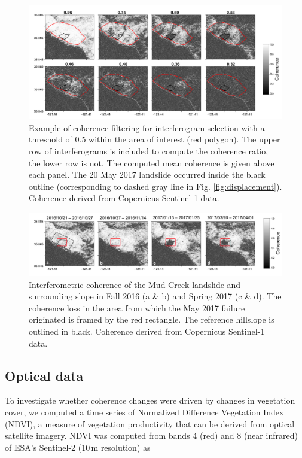 \documentclass[journal abbreviation, manuscript]{copernicus}
\begin{document}
\begin{figure}
    \centering
    \includegraphics[width = \textwidth]{coherence_filter_sample_bw.pdf}
    \caption{Example of coherence filtering for interferogram selection with a threshold of 0.5 within the area of interest (red polygon). The upper row of interferograms is included to compute the coherence ratio, the lower row is not. The computed mean coherence is given above each panel. The 20 May 2017 landslide occurred inside the black outline (corresponding to dashed gray line in Fig. \ref{fig:displacement}). Coherence derived from Copernicus Sentinel-1 data.}
    \label{fig:coherence_filter}
\end{figure}

\begin{figure}[hbt!]
    \centering
    \includegraphics[width = \textwidth]{coherence_evolution_withref.pdf}
    \caption{Interferometric coherence of the Mud Creek landslide and surrounding slope in Fall 2016 (a \& b) and Spring 2017 (c \& d). The coherence loss in the area from which the May 2017 failure originated is framed by the red rectangle. The reference hillslope is outlined in black. Coherence derived from Copernicus Sentinel-1 data.}
    \label{fig:coh_evolution}
\end{figure}

\subsection{Optical data}
To investigate whether coherence changes were driven by changes in vegetation cover, we computed a time series of Normalized Difference Vegetation Index (NDVI), a measure of vegetation productivity that can be derived from optical satellite imagery. NDVI was computed from bands 4 (red) and 8 (near infrared) of ESA's Sentinel-2 (10\,m resolution) as \par
\end{document}

